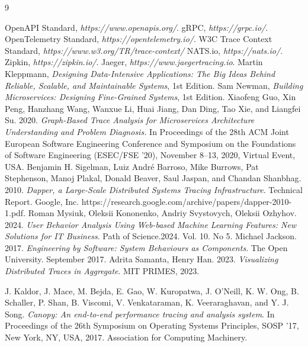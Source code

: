 \documentclass{uetgraduation}
\begin{document}
\begin{thebibliography}{9}


\begin{bibsection}{}
 OpenAPI Standard, \textit{https://www.openapis.org/}.
 gRPC, \textit{https://grpc.io/}.
 OpenTelemetry Standard, \textit{https://opentelemetry.io/}.
 W3C Trace Context Standard, \textit{https://www.w3.org/TR/trace-context/} 
 NATS.io, \textit{https://nats.io/}.
 Zipkin, \textit{https://zipkin.io/}.
 Jaeger, \textit{https://www.jaegertracing.io}.
 Martin Kleppmann, \textit{Designing Data-Intensive Applications: The Big Ideas Behind Reliable, Scalable, and Maintainable Systems}, 1st Edition.
 Sam Newman, \textit{Building Microservices: Designing Fine-Grained Systems}, 1st Edition.
 Xiaofeng Guo, Xin Peng, Hanzhang Wang, Wanxue Li, Huai Jiang, Dan Ding, Tao Xie, and Liangfei Su. 2020. \textit{Graph-Based Trace Analysis for Microservices Architecture Understanding and Problem Diagnosis.} In Proceedings of the 28th ACM Joint European Software Engineering Conference and Symposium on the Foundations of Software Engineering (ESEC/FSE ’20), November 8–13, 2020, Virtual Event, USA.
 Benjamin H. Sigelman, Luiz André Barroso, Mike Burrows, Pat Stephenson, Manoj Plakal, Donald Beaver, Saul Jaspan, and Chandan Shanbhag. 2010. \textit{Dapper, a Large-Scale Distributed Systems Tracing Infrastructure}. Technical Report. Google, Inc. https://research.google.com/archive/papers/dapper-2010-1.pdf.
 Roman Mysiuk, Oleksii Kononenko, Andriy Svystovych, Oleksii Ozhyhov. 2024. \textit{User Behavior Analysis Using Web-based Machine Learning Features: New Solutions for IT Business}. Path of Science.2024. Vol. 10. No 5.
 Michael Jackson. 2017. \textit{Engineering by Software: System Behaviours as Components}. The Open University. September 2017.
 Adrita Samanta, Henry Han. 2023. \textit{Visualizing Distributed Traces in Aggregate}. MIT PRIMES, 2023.

 J. Kaldor, J. Mace, M. Bejda, E. Gao, W. Kuropatwa, J. O’Neill, K. W. Ong, B. Schaller, P. Shan, B. Viscomi, V. Venkataraman, K. Veeraraghavan, and Y. J. Song. \textit{Canopy: An end-to-end performance tracing and analysis system}. In Proceedings of the
26th Symposium on Operating Systems Principles, SOSP ’17, New York, NY, USA, 2017. Association for Computing Machinery.


\end{bibsection}
\end{thebibliography}
\end{document}
